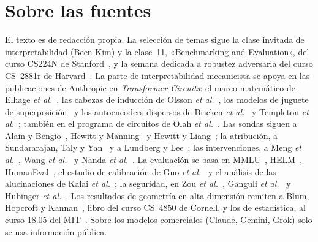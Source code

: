 \documentclass[11pt,a4paper,twoside,openany]{book}
\begin{document}
\section*{Sobre las fuentes}
El texto es de redacción propia. La selección de temas sigue la clase invitada de interpretabilidad (Been Kim) y la clase~11, «Benchmarking and Evaluation», del curso CS224N de Stanford~\cite{cs224n}, y la semana dedicada a robustez adversaria del curso CS~2881r de Harvard~\cite{cs2881}. La parte de interpretabilidad mecanicista se apoya en las publicaciones de Anthropic en \emph{Transformer Circuits}: el marco matemático de Elhage \emph{et al.}~\cite{elhage21}, las cabezas de inducción de Olsson \emph{et al.}~\cite{olsson}, los modelos de juguete de superposición~\cite{elhage22} y los autoencoders dispersos de Bricken \emph{et al.}~\cite{bricken} y Templeton \emph{et al.}~\cite{templeton}; también en el programa de circuitos de Olah \emph{et al.}~\cite{olah-zoom}. Las sondas siguen a Alain y Bengio~\cite{alain}, Hewitt y Manning~\cite{hewitt-manning} y Hewitt y Liang~\cite{hewitt-liang}; la atribución, a Sundararajan, Taly y Yan~\cite{sundararajan} y a Lundberg y Lee~\cite{lundberg}; las intervenciones, a Meng \emph{et al.}~\cite{meng}, Wang \emph{et al.}~\cite{wang-ioi} y Nanda \emph{et al.}~\cite{nanda}. La evaluación se basa en MMLU~\cite{hendrycks}, HELM~\cite{helm}, HumanEval~\cite{chen}, el estudio de calibración de Guo \emph{et al.}~\cite{guo} y el análisis de las alucinaciones de Kalai \emph{et al.}~\cite{kalai25}; la seguridad, en Zou \emph{et al.}~\cite{zou}, Ganguli \emph{et al.}~\cite{ganguli} y Hubinger \emph{et al.}~\cite{hubinger}. Los resultados de geometría en alta dimensión remiten a Blum, Hopcroft y Kannan~\cite{bhk}, libro del curso CS~4850 de Cornell, y los de estadística, al curso 18.05 del MIT~\cite{mit1805}. Sobre los modelos comerciales (Claude, Gemini, Grok) solo se usa información pública.
\end{document}
